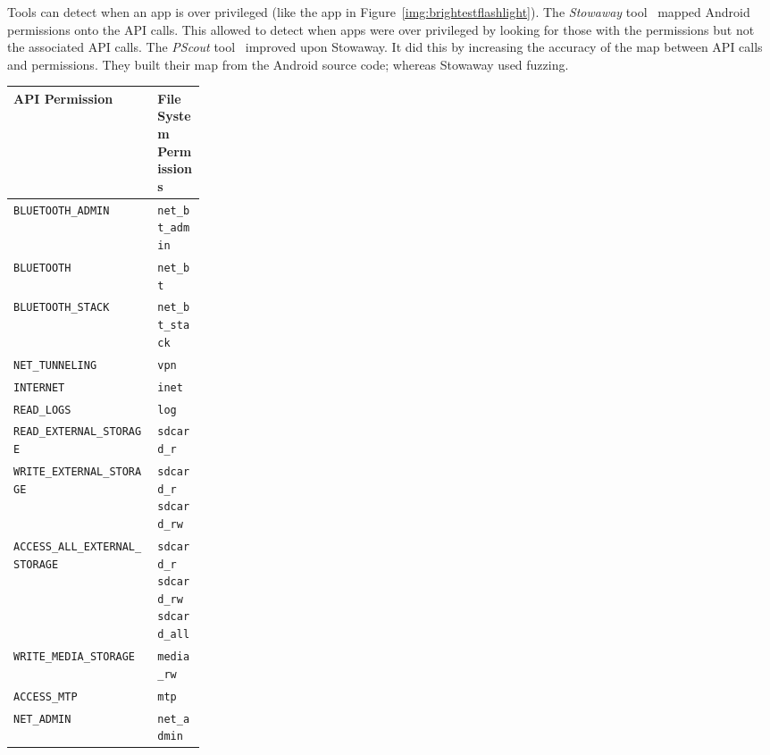 \documentclass[a4paper]{article}
\begin{document}
Tools can detect when an app is over privileged (like the app in
Figure~\ref{img:brightestflashlight}). The \emph{Stowaway}
tool~\cite{Felt:2011kj} mapped Android permissions onto the API calls. This
allowed \citeauthor*{Felt:2011kj} to detect when apps were over privileged by
looking for those with the permissions but not the associated API calls. The
\emph{PScout} tool~\cite{Au:2012ju} improved upon Stowaway.  It did this by
increasing the accuracy of the map between API calls and permissions. They built
their map from the Android source code; whereas Stowaway used fuzzing.

\begin{marginfigure}\scriptsize
  \begin{tabular}{l p{0.25\linewidth}}
\toprule
API Permission                           & File System Permissions                   \\
\midrule
\texttt{BLUETOOTH\_ADMIN}                & \texttt{net\_bt\_admin                 }  \\
\addlinespace
\texttt{BLUETOOTH}                       & \texttt{net\_bt                       }   \\
\addlinespace
\texttt{BLUETOOTH\_STACK}                & \texttt{net\_bt\_stack                 }  \\
\addlinespace
\texttt{NET\_TUNNELING}                  & \texttt{vpn                          }    \\
\addlinespace
\texttt{INTERNET}                        & \texttt{inet                         }    \\
\addlinespace
\texttt{READ\_LOGS}                      & \texttt{log                          }    \\
\addlinespace
\texttt{READ\_EXTERNAL\_STORAGE}         & \texttt{sdcard\_r                     }   \\
\addlinespace
\texttt{WRITE\_EXTERNAL\_STORAGE}        & \texttt{sdcard\_r sdcard\_rw           }  \\
\addlinespace
\texttt{ACCESS\_ALL\_EXTERNAL\_STORAGE}  & \texttt{sdcard\_r sdcard\_rw sdcard\_all} \\
\addlinespace
\texttt{WRITE\_MEDIA\_STORAGE}           & \texttt{media\_rw                     }   \\
\addlinespace
\texttt{ACCESS\_MTP}                     & \texttt{mtp                          }    \\
\addlinespace
\texttt{NET\_ADMIN}                      & \texttt{net\_admin                    }   \\

\end{tabular}
\end{marginfigure}
\end{document}
